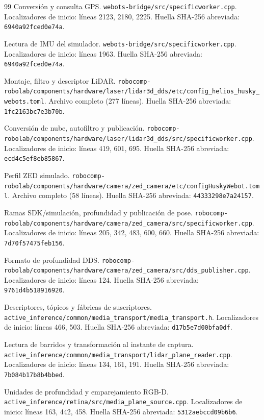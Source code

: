 \documentclass[11pt,a4paper]{article}
\newcommand{\code}[1]{\nolinkurl{#1}}
\newcommand{\file}[1]{\nolinkurl{#1}}
\begin{document}
\begin{thebibliography}{99}
 Conversión y consulta GPS.
\file{webots-bridge/src/specificworker.cpp}.
Localizadores de inicio: líneas 2123, 2180, 2225. Huella SHA-256 abreviada: \code{6940a92fced0e74a}.

 Lectura de IMU del simulador.
\file{webots-bridge/src/specificworker.cpp}.
Localizadores de inicio: líneas 1963. Huella SHA-256 abreviada: \code{6940a92fced0e74a}.

 Montaje, filtro y descriptor LiDAR.
\file{robocomp-robolab/components/hardware/laser/lidar3d_dds/etc/config_helios_husky_webots.toml}.
Archivo completo (277 líneas). Huella SHA-256 abreviada: \code{1fc2163bc7e3b70b}.

 Conversión de nube, autofiltro y publicación.
\file{robocomp-robolab/components/hardware/laser/lidar3d_dds/src/specificworker.cpp}.
Localizadores de inicio: líneas 419, 601, 695. Huella SHA-256 abreviada: \code{ecd4c5ef8eb85867}.

 Perfil ZED simulado.
\file{robocomp-robolab/components/hardware/camera/zed_camera/etc/configHuskyWebot.toml}.
Archivo completo (58 líneas). Huella SHA-256 abreviada: \code{44333298e7a24157}.

 Ramas SDK/simulación, profundidad y publicación de pose.
\file{robocomp-robolab/components/hardware/camera/zed_camera/src/specificworker.cpp}.
Localizadores de inicio: líneas 205, 342, 483, 600, 660. Huella SHA-256 abreviada: \code{7d70f57475feb156}.

 Formato de profundidad DDS.
\file{robocomp-robolab/components/hardware/camera/zed_camera/src/dds_publisher.cpp}.
Localizadores de inicio: líneas 124. Huella SHA-256 abreviada: \code{9761d4b518916920}.

 Descriptores, tópicos y fábricas de suscriptores.
\file{active_inference/common/media_transport/media_transport.h}.
Localizadores de inicio: líneas 466, 503. Huella SHA-256 abreviada: \code{d17b5e7d00bfa0df}.

 Lectura de barridos y transformación al instante de captura.
\file{active_inference/common/media_transport/lidar_plane_reader.cpp}.
Localizadores de inicio: líneas 134, 161, 191. Huella SHA-256 abreviada: \code{7b084b17b8b4bbed}.

 Unidades de profundidad y emparejamiento RGB-D.
\file{active_inference/retina/src/media_plane_source.cpp}.
Localizadores de inicio: líneas 163, 442, 458. Huella SHA-256 abreviada: \code{5312aebccd09b6b6}.


\end{thebibliography}
\end{document}
